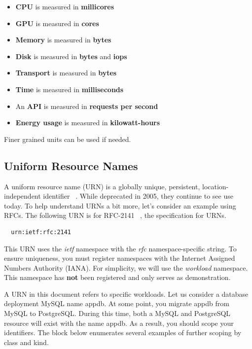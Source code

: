 \documentclass[10pt, a4paper, twocolumn]{article}
\begin{document}
    \begin{itemize}
      \item \textbf{CPU} is measured in \textbf{millicores}
      \item \textbf{GPU} is measured in \textbf{cores}
      \item \textbf{Memory} is measured in \textbf{bytes}
      \item \textbf{Disk} is measured in \textbf{bytes} and \textbf{iops}
      \item \textbf{Transport} is measured in \textbf{bytes}
      \item \textbf{Time} is measured in \textbf{milliseconds}
      \item An \textbf{API} is measured in \textbf{requests per second}
      \item \textbf{Energy usage} is measured in \textbf{kilowatt-hours}
    \end{itemize}

    Finer grained units can be used if needed.

  \subsection*{Uniform Resource Names}
    A uniform resource name (URN) is a globally unique, persistent, location-independent identifier ~\cite{rfc8141}.
    While deprecated in 2005, they continue to see use today.
    To help understand URNs a bit more, let's consider an example using RFCs.
    The following URN is for RFC-2141 ~\cite{rfc2141}, the specification for URNs.

\begin{verbatim}
  urn:ietf:rfc:2141
\end{verbatim}

    This URN uses the \textit{ietf} namespace with the \textit{rfc} namespace-specific string.
    To ensure uniqueness, you must register namespaces with the Internet Assigned Numbers Authority (IANA).
    For simplicity, we will use the \textit{workload} namespace.
    This namespace has \textbf{not} been registered and only serves as demonstration.

    A URN in this document refers to specific workloads.
    Let us consider a database deployment MySQL name appdb.
    At some point, you migrate appdb from MySQL to PostgreSQL.
    During this time, both a MySQL and PostgreSQL resource will exist with the name appdb.
    As a result, you should scope your identifiers.
    The block below enumerates several examples of further scoping by class and kind.
\end{document}
